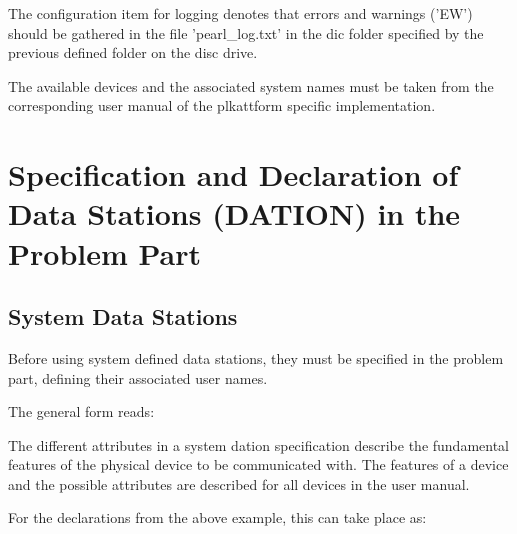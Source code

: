 
The configuration item for logging denotes that errors and warnings ('EW')
should be gathered in the file 'pearl\_log.txt' in the dic folder specified
by the previous defined folder on the disc drive.

The available devices and the associated system names must be taken from
the corresponding user manual of the \OpenPEARL{} plkattform 
specific implementation.

\section{Specification and Declaration of Data Stations (DATION) in 
the Problem Part}   %
\label{sec_dation_problem_part}

\subsection{System Data Stations}   %

Before using system defined data stations, they must be specified in the
problem part, defining their associated user names. 

The general form reads:




The different attributes in a system dation specification describe the
fundamental features of the physical device to be communicated with. The
features of a device and the possible attributes are described for all
devices in the user manual.

For the declarations from the above example, this can take place as:

